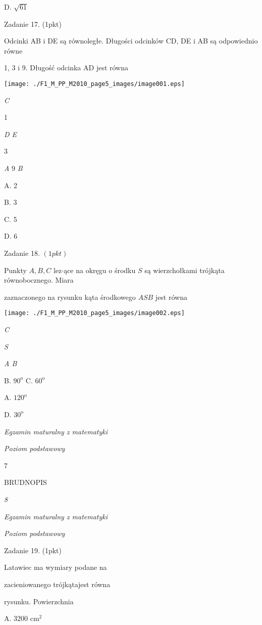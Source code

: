 \documentclass[a4paper,12pt]{article}
\begin{document}
D. $\sqrt{61}$

Zadanie 17. (1pkt)

Odcinki AB i DE są równoległe. Długości odcinków CD, DE i AB są odpowiednio równe

1, 3 i 9. Długość odcinka AD jest równa
\begin{center}
\texttt{[image: ./F1\_M\_PP\_M2010\_page5\_images/image001.eps]}
\end{center}
{\it C}

1

{\it D E}

3

{\it A}  9  {\it B}

A. 2

B. 3

C. 5

D. 6

Zadanie 18. $(1pkt)$

Punkty $A, B, C$ lez$\cdot$ące na okręgu o środku $S$ są wierzchołkami trójkąta równobocznego. Miara

zaznaczonego na rysunku kąta środkowego $ASB$ jest równa
\begin{center}
\texttt{[image: ./F1\_M\_PP\_M2010\_page5\_images/image002.eps]}
\end{center}
{\it C}

{\it S}

{\it A  B}

B. $90^{\mathrm{o}}$  C. $60^{\mathrm{o}}$

A. $120^{\mathrm{o}}$

D. $30^{\mathrm{o}}$





{\it Egzamin maturalny z matematyki}

{\it Poziom podstawowy}

7

BRUDNOPIS





{\it 8}

{\it Egzamin maturalny z matematyki}

{\it Poziom podstawowy}

Zadanie 19. (1pkt)

Latawiec ma wymiary podane na

zacieniowanego trójkątajest równa

rysunku. Powierzchnia

A. 3200 $\mathrm{c}\mathrm{m}^{2}$
\end{document}
